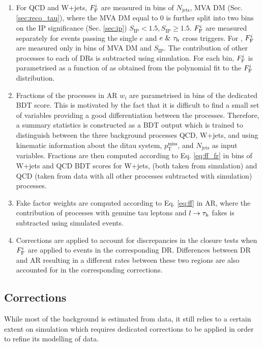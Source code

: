 \begin{enumerate}
    \item For QCD and W+jets, $F_\text{F}^i$ are measured in bins of $N_\text{jets}$, MVA DM (Sec. \ref{sec:reco_tau}), where the MVA DM equal to 0 is further split into two bins on the IP significance (Sec. \ref{sec:ip}) $S_{\text{IP}} < 1.5, S_{\text{IP}} \geq 1.5$. $F_\text{F}^i$ are measured separately for events passing the single $e$ and $e~\&~\tau_\mathrm{h}$ cross triggers. For \ttbar, $F_\text{F}^i$ are measured only in bins of MVA DM and $S_{\text{IP}}$. The contribution of other processes to each of DRs is subtracted using simulation. For each bin, $F_\text{F}^i$ is parametrised as a function of \tauh \pt as obtained from the polynomial fit to the $F_\text{F}^i$ distribution. 
    
    \item Fractions of the processes in AR $w_i$ are parametrised in bins of the dedicated BDT score. This is motivated by the fact that it is difficult to find a small set of variables providing a good differentiation between the \jtt processes. Therefore, a summary statistics is constructed as a BDT output which is trained to distinguish between the three background processes QCD, W+jets, and \ttbar using kinematic information about the ditau system, $p_\text{T}^\text{miss}$, and $N_\text{jets}$  as input variables. Fractions are then computed according to Eq. \ref{eq:ff_fr} in bins of W+jets and QCD BDT scores for W+jets, \ttbar (both taken from simulation) and QCD (taken from data with all other processes subtracted with simulation) processes.
    
    \item Fake factor weights are computed according to Eq. \ref{eq:ff} in AR, where the contribution of processes with genuine tau leptons and $l\to\tau_\mathrm{h}$ fakes is subtracted using simulated events.
    
    \item Corrections are applied to account for discrepancies in the closure tests when $F_\text{F}^i$ are applied to events in the corresponding DR. Differences between DR and AR resulting in a different \jtt rates between these two regions are also accounted for in the corresponding corrections. 
\end{enumerate}

\subsection{Corrections}\label{sec:corr}
While most of the background is estimated from data, it still relies to a certain extent on simulation which requires dedicated corrections to be applied in order to refine its modelling of data. 

